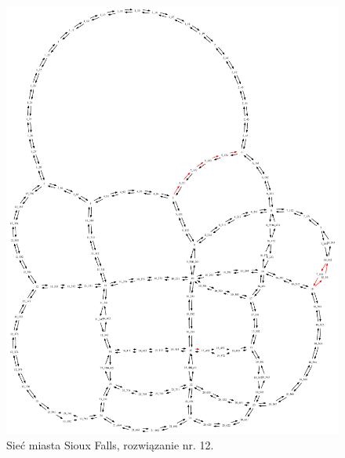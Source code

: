 \documentclass[twoside,12pt]{report}
\begin{document}
\begin{figure}[ht]
\centering
\includegraphics[totalheight=0.580\textheight, angle=90]{img/sioux-out/12/network2}
\caption{Sieć miasta Sioux Falls, rozwiązanie nr. 12.}
\label{sioux12}
\end{figure}
\end{document}
